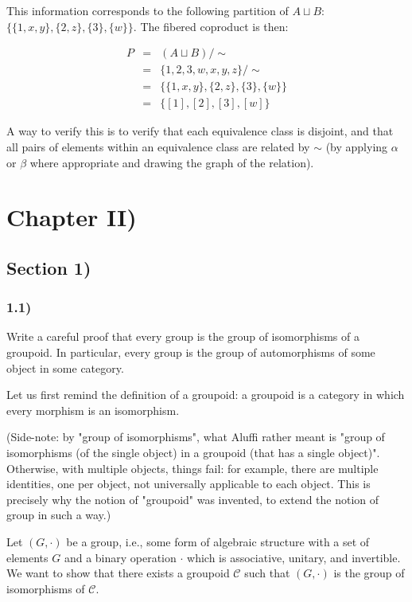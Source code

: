 \documentclass[12pt, letterpaper, twoside]{report}
\begin{document}
This information corresponds to the following partition of $A \sqcup B$: $\{ \{1,x,y\}, \{2,z\}, \{3\}, \{w\} \}$. The fibered coproduct is then:

$$
\begin{array}{lll}
P &=& (A \sqcup B) / \sim \\
  &=& \{1,2,3,w,x,y,z\} / \sim \\
  &=& \{\{1,x,y\}, \{2,z\}, \{3\}, \{w\}\} \\
  &=& \{[1], [2], [3], [w]\}
\end{array}
$$

A way to verify this is to verify that each equivalence class is disjoint, and that all pairs of elements within an equivalence class are related by $\sim$ (by applying $\alpha$ or $\beta$ where appropriate and drawing the graph of the relation).
\newpage

\chapter*{Chapter II)}

\section*{Section 1)}

\subsection*{1.1)}

Write a careful proof that every group is the group of isomorphisms of a groupoid. In particular, every group is the group of automorphisms of some object in some category.

Let us first remind the definition of a groupoid: a groupoid is a category in which every morphism is an isomorphism.

(Side-note: by "group of isomorphisms", what Aluffi rather meant is "group of isomorphisms (of the single object) in a groupoid (that has a single object)". Otherwise, with multiple objects, things fail: for example, there are multiple identities, one per object, not universally applicable to each object. This is precisely why the notion of "groupoid" was invented, to extend the notion of group in such a way.)

Let $(G, \cdot)$ be a group, i.e., some form of algebraic structure with a set of elements $G$ and a binary operation $\cdot$ which is associative, unitary, and invertible. We want to show that there exists a groupoid $\mathcal{C}$ such that $(G, \cdot)$ is the group of isomorphisms of $\mathcal{C}$.
\end{document}
